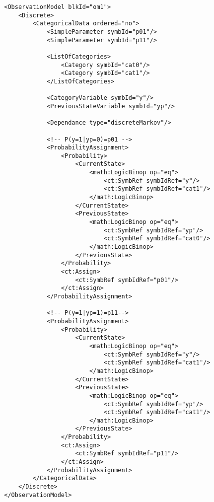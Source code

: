 \lstset{language=XML}
\begin{lstlisting}
        <ObservationModel blkId="om1">
            <Discrete>
                <CategoricalData ordered="no">
                    <SimpleParameter symbId="p01"/>
                    <SimpleParameter symbId="p11"/>
                    
                    <ListOfCategories> 
                        <Category symbId="cat0"/>
                        <Category symbId="cat1"/>
                    </ListOfCategories>
                    
                    <CategoryVariable symbId="y"/>
                    <PreviousStateVariable symbId="yp"/>
                    
                    <Dependance type="discreteMarkov"/>
                    
                    <!-- P(y=1|yp=0)=p01 -->
                    <ProbabilityAssignment>
                        <Probability>
                            <CurrentState>
                                <math:LogicBinop op="eq">
                                    <ct:SymbRef symbIdRef="y"/>
                                    <ct:SymbRef symbIdRef="cat1"/>
                                </math:LogicBinop>
                            </CurrentState>
                            <PreviousState>
                                <math:LogicBinop op="eq">
                                    <ct:SymbRef symbIdRef="yp"/>
                                    <ct:SymbRef symbIdRef="cat0"/>
                                </math:LogicBinop>
                            </PreviousState>
                        </Probability>
                        <ct:Assign>
                            <ct:SymbRef symbIdRef="p01"/>
                        </ct:Assign>
                    </ProbabilityAssignment>
                    
                    <!-- P(y=1|yp=1)=p11-->
                    <ProbabilityAssignment>
                        <Probability>
                            <CurrentState>
                                <math:LogicBinop op="eq">
                                    <ct:SymbRef symbIdRef="y"/>
                                    <ct:SymbRef symbIdRef="cat1"/>
                                </math:LogicBinop>
                            </CurrentState>
                            <PreviousState>
                                <math:LogicBinop op="eq">
                                    <ct:SymbRef symbIdRef="yp"/>
                                    <ct:SymbRef symbIdRef="cat1"/>
                                </math:LogicBinop>
                            </PreviousState>
                        </Probability>
                        <ct:Assign>
                            <ct:SymbRef symbIdRef="p11"/>
                        </ct:Assign>
                    </ProbabilityAssignment>
                </CategoricalData>
            </Discrete>
        </ObservationModel>
\end{lstlisting}


